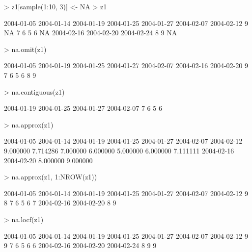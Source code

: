 \documentclass{Z}
\begin{document}
\begin{Schunk}
\begin{Sinput}
> z1[sample(1:10, 3)] <- NA
> z1
\end{Sinput}
\begin{Soutput}
2004-01-05 2004-01-14 2004-01-19 2004-01-25 2004-01-27 2004-02-07 2004-02-12 
         9         NA          7          6          5          6         NA 
2004-02-16 2004-02-20 2004-02-24 
         8          9         NA 
\end{Soutput}
\begin{Sinput}
> na.omit(z1)
\end{Sinput}
\begin{Soutput}
2004-01-05 2004-01-19 2004-01-25 2004-01-27 2004-02-07 2004-02-16 2004-02-20 
         9          7          6          5          6          8          9 
\end{Soutput}
\begin{Sinput}
> na.contiguous(z1)
\end{Sinput}
\begin{Soutput}
2004-01-19 2004-01-25 2004-01-27 2004-02-07 
         7          6          5          6 
\end{Soutput}
\begin{Sinput}
> na.approx(z1)
\end{Sinput}
\begin{Soutput}
2004-01-05 2004-01-14 2004-01-19 2004-01-25 2004-01-27 2004-02-07 2004-02-12 
  9.000000   7.714286   7.000000   6.000000   5.000000   6.000000   7.111111 
2004-02-16 2004-02-20 
  8.000000   9.000000 
\end{Soutput}
\begin{Sinput}
> na.approx(z1, 1:NROW(z1))
\end{Sinput}
\begin{Soutput}
2004-01-05 2004-01-14 2004-01-19 2004-01-25 2004-01-27 2004-02-07 2004-02-12 
         9          8          7          6          5          6          7 
2004-02-16 2004-02-20 
         8          9 
\end{Soutput}
\begin{Sinput}
> na.locf(z1)
\end{Sinput}
\begin{Soutput}
2004-01-05 2004-01-14 2004-01-19 2004-01-25 2004-01-27 2004-02-07 2004-02-12 
         9          9          7          6          5          6          6 
2004-02-16 2004-02-20 2004-02-24 
         8          9          9 
\end{Soutput}
\end{Schunk}
\end{document}
